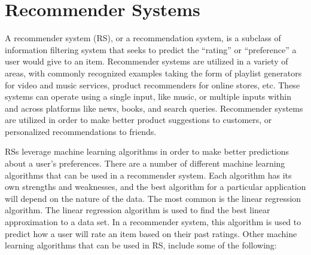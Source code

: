 \documentclass[11pt]{article}
\begin{document}
\section{Recommender Systems}

A recommender system (RS), or a recommendation system, is a subclass of information filtering system that seeks to predict the “rating” or “preference” a user would give to an item. Recommender systems are utilized in a variety of areas, with commonly recognized examples taking the form of playlist generators for video and music services, product recommenders for online stores, etc. These systems can operate using a single input, like music, or multiple inputs within and across platforms like news, books, and search queries. Recommender systems are utilized in order to make better product suggestions to customers, or personalized recommendations to friends.

RSs leverage machine learning algorithms in order to make better predictions about a user’s preferences. There are a number of different machine learning algorithms that can be used in a recommender system. Each algorithm has its own strengths and weaknesses, and the best algorithm for a particular application will depend on the nature of the data. The most common is the linear regression algorithm. The linear regression algorithm is used to find the best linear approximation to a data set. In a recommender system, this algorithm is used to predict how a user will rate an item based on their past ratings. Other machine learning algorithms that can be used in RS, include some of the following:
\end{document}
